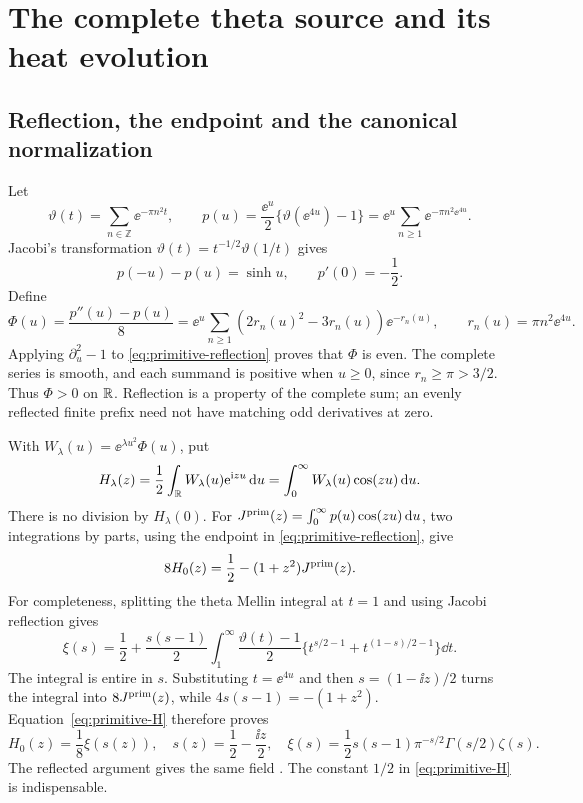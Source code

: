 \section{The complete theta source and its heat evolution}\label{sec:source}

\subsection{Reflection, the endpoint and the canonical normalization}

Let
\[
 \vartheta(t)=\sum_{n\in\mathbb Z}\ee^{-\pi n^2t},\qquad
 p(u)=\frac{\ee^u}{2}\{\vartheta(\ee^{4u})-1\}
     =\ee^u\sum_{n\ge1}\ee^{-\pi n^2\ee^{4u}}.
\]
Jacobi's transformation
\(\vartheta(t)=t^{-1/2}\vartheta(1/t)\)
\cite{DLMFThetaModular} gives
\begin{equation}\label{eq:primitive-reflection}
 p(-u)-p(u)=\sinh u,\qquad p'(0)=-\frac12.
\end{equation}
Define
\begin{equation}\label{eq:source}
 \Phi(u)=\frac{p''(u)-p(u)}8
 =\ee^u\sum_{n\ge1}(2r_n(u)^2-3r_n(u))\ee^{-r_n(u)},
 \qquad r_n(u)=\pi n^2\ee^{4u}.
\end{equation}
Applying \(\partial_u^2-1\) to \eqref{eq:primitive-reflection}
proves that \(\Phi\) is even. The complete series is smooth, and
each summand is positive when \(u\ge0\), since \(r_n\ge\pi>3/2\).
Thus \(\Phi>0\) on \(\mathbb R\). Reflection is a property of the complete
sum; an evenly reflected finite prefix need not have matching odd
derivatives at zero.

With \(W_\lambda(u)=\ee^{\lambda u^2}\Phi(u)\), put
\begin{equation}\label{eq:H}
 H_\lambda(z)=\frac12\int_\mathbb R W_\lambda(u)\mathrm e^{\mathrm i zu}\,\mathrm d u
            =\int_0^\infty W_\lambda(u)\cos(zu)\,\mathrm d u.
\end{equation}
There is no division by \(H_\lambda(0)\).
For \(J^{\rm prim}(z)=\int_0^\infty p(u)\cos(zu)\,\mathrm d u\),
two integrations by parts, using the endpoint in
\eqref{eq:primitive-reflection}, give
\begin{equation}\label{eq:primitive-H}
 8H_0(z)=\frac12-(1+z^2)J^{\rm prim}(z).
\end{equation}
For completeness, splitting the theta Mellin integral at \(t=1\)
and using Jacobi reflection gives
\[
 \xi(s)=\frac12+\frac{s(s-1)}2
 \int_1^\infty \frac{\vartheta(t)-1}{2}
       \{t^{s/2-1}+t^{(1-s)/2-1}\}\dd t.
\]
The integral is entire in \(s\). Substituting \(t=\ee^{4u}\)
and then \(s=(1-\ii z)/2\) turns the integral into
\(8J^{\rm prim}(z)\), while \(4s(s-1)=-(1+z^2)\).
Equation~\eqref{eq:primitive-H} therefore proves
\begin{equation}\label{eq:xi}
 H_0(z)=\frac18\xi(s(z)),\quad
 s(z)=\frac12-\frac{\ii z}2,\quad
 \xi(s)=\frac12s(s-1)\pi^{-s/2}\Gamma(s/2)\zeta(s).
\end{equation}
The reflected argument gives the same field
\cite{DLMFGreenPrime}. The constant \(1/2\) in
\eqref{eq:primitive-H} is indispensable.

